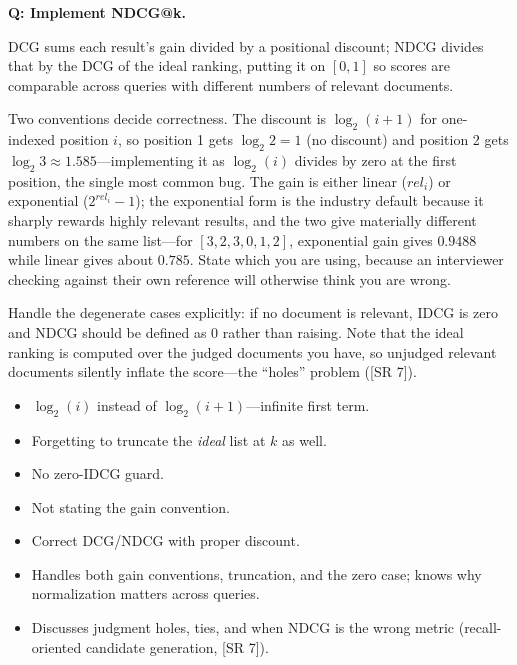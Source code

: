 \begin{interviewq}
\textbf{Q: Implement NDCG@k.}

 \quad {} \quad \badgefreq{\freqhigh}

\stronganswer

DCG sums each result's gain divided by a positional discount; NDCG divides that by the DCG of the ideal ranking, putting it on $[0, 1]$ so scores are comparable across queries with different numbers of relevant documents.

Two conventions decide correctness. The discount is $\log_2(i + 1)$ for one-indexed position $i$, so position 1 gets $\log_2 2 = 1$ (no discount) and position 2 gets $\log_2 3 \approx 1.585$---implementing it as $\log_2(i)$ divides by zero at the first position, the single most common bug. The gain is either linear ($rel_i$) or exponential ($2^{rel_i} - 1$); the exponential form is the industry default because it sharply rewards highly relevant results, and the two give materially different numbers on the same list---for $[3,2,3,0,1,2]$, exponential gain gives $0.9488$ while linear gives about $0.785$. State which you are using, because an interviewer checking against their own reference will otherwise think you are wrong.

Handle the degenerate cases explicitly: if no document is relevant, IDCG is zero and NDCG should be defined as 0 rather than raising. Note that the ideal ranking is computed over the judged documents you have, so unjudged relevant documents silently inflate the score---the ``holes'' problem ([SR 7]).

\redflags
\begin{itemize}
    \item $\log_2(i)$ instead of $\log_2(i+1)$---infinite first term.
    \item Forgetting to truncate the \emph{ideal} list at $k$ as well.
    \item No zero-IDCG guard.
    \item Not stating the gain convention.
\end{itemize}


\goodgreat
\begin{itemize}
    \item {} Correct DCG/NDCG with proper discount.
    \item {} Handles both gain conventions, truncation, and the zero case; knows why normalization matters across queries.
    \item {} Discusses judgment holes, ties, and when NDCG is the wrong metric (recall-oriented candidate generation, [SR 7]).
\end{itemize}

\end{interviewq}

